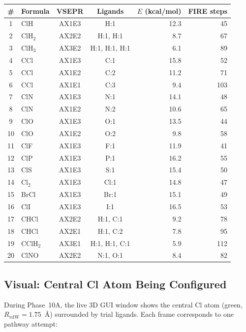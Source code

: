 \documentclass[11pt,a4paper]{article}
\begin{document}
\begin{center}
\small
\begin{tabular}{clccrr}
\toprule
\textbf{\#} & \textbf{Formula} & \textbf{VSEPR} & \textbf{Ligands}
  & \textbf{$E$ (kcal/mol)} & \textbf{FIRE steps} \\
\midrule
1  & ClH    & AX1E3 & H:1           &  12.3 &  45 \\
2  & ClH$_2$ & AX2E2 & H:1, H:1     &   8.7 &  67 \\
3  & ClH$_3$ & AX3E2 & H:1, H:1, H:1 &  6.1 &  89 \\
4  & CCl    & AX1E3 & C:1           &  15.8 &  52 \\
5  & CCl    & AX1E2 & C:2           &  11.2 &  71 \\
6  & CCl    & AX1E1 & C:3           &   9.4 & 103 \\
7  & ClN    & AX1E3 & N:1           &  14.1 &  48 \\
8  & ClN    & AX1E2 & N:2           &  10.6 &  65 \\
9  & ClO    & AX1E3 & O:1           &  13.5 &  44 \\
10 & ClO    & AX1E2 & O:2           &   9.8 &  58 \\
11 & ClF    & AX1E3 & F:1           &  11.9 &  41 \\
12 & ClP    & AX1E3 & P:1           &  16.2 &  55 \\
13 & ClS    & AX1E3 & S:1           &  15.4 &  50 \\
14 & Cl$_2$ & AX1E3 & Cl:1          &  14.8 &  47 \\
15 & BrCl   & AX1E3 & Br:1          &  15.1 &  49 \\
16 & ClI    & AX1E3 & I:1           &  16.5 &  53 \\
17 & CHCl   & AX2E2 & H:1, C:1      &   9.2 &  78 \\
18 & CHCl   & AX2E1 & H:1, C:2      &   7.8 &  95 \\
19 & CClH$_2$ & AX3E1 & H:1, H:1, C:1 & 5.9 & 112 \\
20 & ClNO   & AX2E2 & N:1, O:1      &   8.4 &  82 \\
\bottomrule
\end{tabular}
\end{center}

\subsection{Visual: Central Cl Atom Being Configured}

During Phase~10A, the live 3D GUI window shows the central Cl atom
(green, $R_\text{vdW} = 1.75$~\AA) surrounded by trial ligands.
Each frame corresponds to one pathway attempt:
\end{document}
